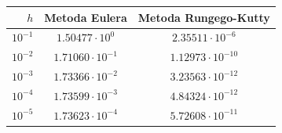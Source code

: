 \begin{tabular}{rcc}
\toprule
$h$ & Metoda Eulera & Metoda Rungego-Kutty \\
\midrule
$10^{-1}$ & $1.50477\cdot 10^{0}$ & $2.35511\cdot 10^{-6}$ \\
$10^{-2}$ & $1.71060\cdot 10^{-1}$ & $1.12973\cdot 10^{-10}$ \\
$10^{-3}$ & $1.73366\cdot 10^{-2}$ & $3.23563\cdot 10^{-12}$ \\
$10^{-4}$ & $1.73599\cdot 10^{-3}$ & $4.84324\cdot 10^{-12}$ \\
$10^{-5}$ & $1.73623\cdot 10^{-4}$ & $5.72608\cdot 10^{-11}$ \\
\bottomrule
\end{tabular}
